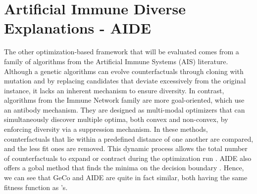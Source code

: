 \section{Artificial Immune Diverse Explanations - AIDE}
The other optimization-based framework that will be evaluated comes from a family of algorithms from the Artificial Immune Systems (AIS) literature. Although a genetic algorithms can evolve counterfactuals through cloning with mutation and by replacing candidates that deviate excessively from the original instance, it lacks an inherent mechanism to ensure diversity. In contrast, algorithms from the Immune Network family are more goal-oriented, which use an antibody mechanism. They are designed as multi-modal optimizers that can simultaneously discover multiple optima, both convex and non-convex, by enforcing diversity via a suppression mechanism. In these methods, counterfactuals that lie within a predefined distance of one another are compared, and the less fit ones are removed. This dynamic process allows the total number of counterfactuals to expand or contract during the optimization run \citep{brownlee2011clever}. AIDE also offers a gobal method that finds the minima on the decision boundary \citep{forrest2021contrastive}. Hence, we can see that GeCo and AIDE are quite in fact similar, both having the same fitness function as \citet{wachter2017counterfactual}'s.

